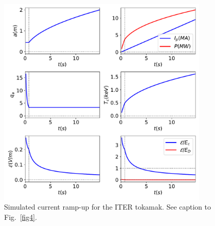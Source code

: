 \documentclass[12pt,prb,aps]{revtex4-1}
\begin{document}
\begin{figure}
\centerline{\includegraphics[width=0.9\textwidth]{Figure6.pdf}}
\caption{Simulated current ramp-up for the ITER tokamak. See caption to Fig.~\ref{fig4}.}\label{fig6}
\end{figure}
\end{document}
